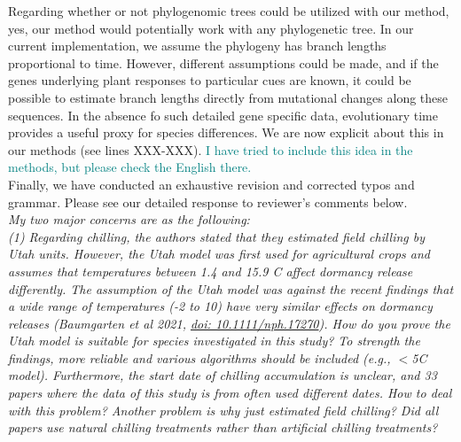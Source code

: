 \documentclass[11pt]{article}
\begin{document}
Regarding whether or not phylogenomic trees could be utilized with our method, yes, our method would potentially work with any phylogenetic tree. In our current implementation, we assume the phylogeny has branch lengths proportional to time. However, different assumptions could be made, and if the genes underlying plant responses to particular cues are known, it could be possible to estimate branch lengths directly from mutational changes along these sequences. In the absence fo such detailed gene specific data, evolutionary time provides a useful proxy for species differences. We are now explicit about this in our methods (see lines XXX-XXX). 
\textcolor{teal}{I have tried to include this idea in the methods, but please check the English there.}\\

Finally, we have conducted an exhaustive revision and corrected typos and grammar. Please see our detailed response to reviewer's comments below. \\


\emph{My two major concerns are as the following:}\\
\emph{(1) Regarding chilling, the authors stated that they estimated field chilling by Utah units. However, the Utah model was first used for agricultural crops and assumes that temperatures between 1.4 and 15.9 \degree C affect dormancy release differently. The assumption of the Utah model was against the recent findings that a wide range of temperatures (-2 to 10\degreeC) have very similar effects on dormancy releases (Baumgarten et al 2021, \url{doi: 10.1111/nph.17270}). How do you prove the Utah model is suitable for species investigated in this study? To strength the findings, more reliable and various algorithms should be included (e.g., $<$5\degree C model). Furthermore, the start date of chilling accumulation is unclear, and 33 papers where the data of this study is from often used different dates. How to deal with this problem? Another problem is why just estimated field chilling? Did all papers use natural chilling treatments rather than artificial chilling treatments?}\\
\end{document}
